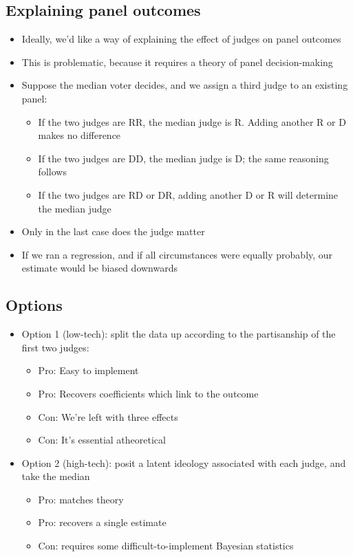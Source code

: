 \documentclass[12pt,twoside]{article}
\providecommand{\tightlist}{%
  \setlength{\itemsep}{0pt}\setlength{\parskip}{0pt}}
\begin{document}
\subsection{Explaining panel outcomes}\label{explaining-panel-outcomes}

\begin{itemize}
\tightlist
\item
  Ideally, we'd like a way of explaining the effect of judges on panel
  outcomes
\item
  This is problematic, because it requires a theory of panel
  decision-making
\item
  Suppose the median voter decides, and we assign a third judge to an
  existing panel:

  \begin{itemize}
  \tightlist
  \item
    If the two judges are RR, the median judge is R. Adding another R or
    D makes no difference
  \item
    If the two judges are DD, the median judge is D; the same reasoning
    follows
  \item
    If the two judges are RD or DR, adding another D or R will determine
    the median judge
  \end{itemize}
\item
  Only in the last case does the judge matter
\item
  If we ran a regression, and if all circumstances were equally
  probably, our estimate would be biased downwards
\end{itemize}

\subsection{Options}\label{options}

\begin{itemize}
\tightlist
\item
  Option 1 (low-tech): split the data up according to the partisanship
  of the first two judges:

  \begin{itemize}
  \tightlist
  \item
    Pro: Easy to implement
  \item
    Pro: Recovers coefficients which link to the outcome
  \item
    Con: We're left with three effects
  \item
    Con: It's essential atheoretical
  \end{itemize}
\item
  Option 2 (high-tech): posit a latent ideology associated with each
  judge, and take the median

  \begin{itemize}
  \tightlist
  \item
    Pro: matches theory
  \item
    Pro: recovers a single estimate
  \item
    Con: requires some difficult-to-implement Bayesian statistics
  \end{itemize}
\end{itemize}
\end{document}
